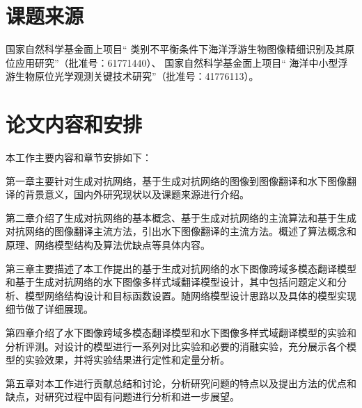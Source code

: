 \section{课题来源}
国家自然科学基金面上项目“ 类别不平衡条件下海洋浮游生物图像精细识别及其原位应用研究”（批准号：61771440）、   国家自然科学基金面上项目“ 海洋中小型浮游生物原位光学观测关键技术研究”（批准号：41776113）。


\section{论文内容和安排}
本工作主要内容和章节安排如下：

第一章主要针对生成对抗网络，基于生成对抗网络的图像到图像翻译和水下图像翻译的背景意义，国内外研究现状以及课题来源进行介绍。

第二章介绍了生成对抗网络的基本概念、基于生成对抗网络的主流算法和基于生成对抗网络的图像翻译主流方法，引出水下图像翻译的主流方法。概述了算法概念和原理、网络模型结构及算法优缺点等具体内容。

第三章主要描述了本工作提出的基于生成对抗网络的水下图像跨域多模态翻译模型和基于生成对抗网络的水下图像多样式域翻译模型设计，其中包括问题定义和分析、模型网络结构设计和目标函数设置。随网络模型设计思路以及具体的模型实现细节做了详细展现。

第四章介绍了水下图像跨域多模态翻译模型和水下图像多样式域翻译模型的实验和分析评测。对设计的模型进行一系列对比实验和必要的消融实验，充分展示各个模型的实验效果，并将实验结果进行定性和定量分析。

第五章对本工作进行贡献总结和讨论，分析研究问题的特点以及提出方法的优点和缺点，对研究过程中固有问题进行分析和进一步展望。

